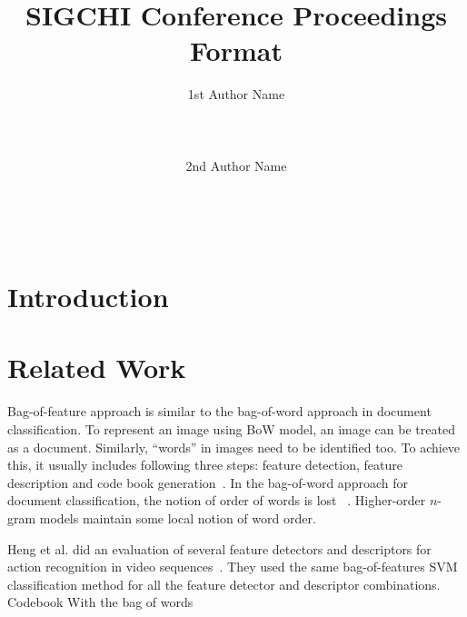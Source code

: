 \documentclass{sigchi}
\begin{document}
\title{SIGCHI Conference Proceedings Format}

\author{
  \alignauthor 1st Author Name\\
    \\
    \\
    \\
  \alignauthor 2nd Author Name\\
    \\
    \\
    \\
}

\maketitle

\begin{abstract}
\end{abstract}



\section{Introduction}


\section{Related Work}
Bag-of-feature approach is similar to the bag-of-word approach in document classification.
To represent an image using BoW model, an image can be treated as a document. Similarly,
``words'' in images need to be identified too. To achieve this, it usually includes
following three steps: feature detection, feature description and code book generation~\cite{fei2005}.
In the bag-of-word approach for document classification, the notion of order of words is lost
~\cite{Russell2003}. Higher-order $n$-gram models maintain some local notion of word order.

Heng et al. did an evaluation of several feature detectors and descriptors for action
recognition in video sequences~\cite{wang2009}. They used the same bag-of-features SVM classification
method for all the feature detector and descriptor combinations.
Codebook With the bag of words
\end{document}
